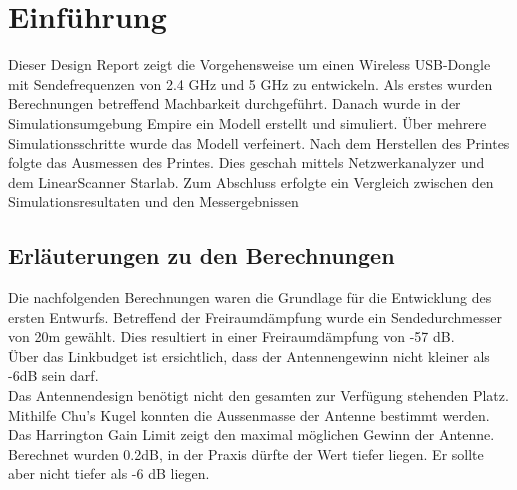 \section{Einführung}
Dieser Design Report zeigt die Vorgehensweise um einen Wireless USB-Dongle mit Sendefrequenzen von 2.4 GHz und 5 GHz zu entwickeln. Als erstes wurden Berechnungen betreffend Machbarkeit durchgeführt. Danach wurde in der Simulationsumgebung Empire ein Modell erstellt und simuliert. Über mehrere Simulationsschritte wurde das Modell verfeinert. Nach dem Herstellen des Printes folgte das Ausmessen des Printes. Dies geschah mittels Netzwerkanalyzer und dem LinearScanner Starlab. Zum Abschluss erfolgte ein Vergleich zwischen den Simulationsresultaten und den Messergebnissen

\subsection{Erläuterungen zu den Berechnungen}
Die nachfolgenden Berechnungen waren die Grundlage für die Entwicklung des ersten Entwurfs. 
Betreffend der Freiraumdämpfung wurde ein Sendedurchmesser von 20m gewählt. Dies resultiert in einer Freiraumdämpfung von -57 dB.\\
Über das Linkbudget ist ersichtlich, dass der Antennengewinn nicht kleiner als -6dB sein darf.\\
Das Antennendesign benötigt nicht den gesamten zur Verfügung stehenden Platz. Mithilfe Chu's Kugel konnten die Aussenmasse der Antenne bestimmt werden. Das Harrington Gain Limit zeigt den maximal möglichen Gewinn der Antenne. Berechnet wurden 0.2dB, in der Praxis dürfte der Wert tiefer liegen. Er sollte aber nicht tiefer als -6 dB liegen.



